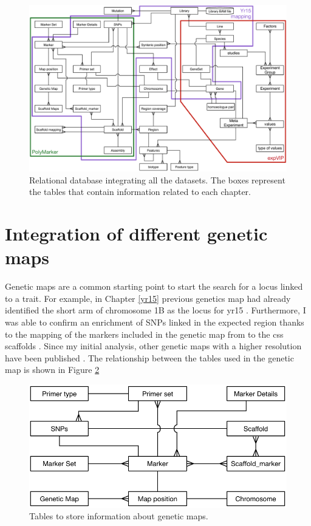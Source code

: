 \begin{figure}
\includegraphics[width=1\textwidth]{Conclusions/Figures/CompleteDatabase.pdf}
\caption[Relational database integrating all the datasets.]{Relational database integrating all the datasets. The boxes represent the tables that contain information related to each chapter.}
\label{fig:discussion:allTables}
\end{figure}


\section{Integration of different genetic maps}

Genetic maps are a common starting point to start the search for a locus linked to a trait. 
For example, in Chapter \ref{yr15} previous genetics map had already identified the short arm of chromosome 1B as the locus for \acrshort{yr15} \citep{Murphy2009}.
Furthermore, I was able to confirm an enrichment of SNPs linked in the expected region thanks to the mapping of the markers included in the genetic map from \citet{Wang2014} to the \acrshort{css} scaffolds \citep{Mayer2014}. Since my initial analysis, other genetic maps with a higher resolution have been published \citep{Chapman2015, Allen2016,Winfield2016}. 
The relationship between the tables used in the genetic map is shown in Figure \ref{fig:discussion:geneticMapsTables}

\begin{figure}
\includegraphics[width=1\textwidth]{Conclusions/Figures/GenetiMapTables.pdf}
\caption{Tables to store information about genetic maps.}
\label{fig:discussion:geneticMapsTables}
\end{figure}

